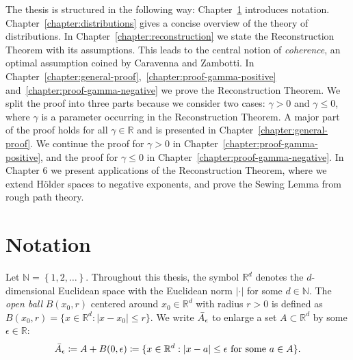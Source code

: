 The thesis is structured in the following way: Chapter~\ref{chapter:notation} introduces notation. Chapter~\ref{chapter:distributions} gives a concise overview of the theory of distributions. In Chapter~\ref{chapter:reconstruction} we state the Reconstruction Theorem with its assumptions. This leads to the central notion of \emph{coherence}, an optimal assumption coined by Caravenna and Zambotti. In Chapter~\ref{chapter:general-proof},~\ref{chapter:proof-gamma-positive} and~\ref{chapter:proof-gamma-negative} we prove the Reconstruction Theorem. We split the proof into three parts because we consider two cases: \(\gamma > 0\) and \(\gamma \leq 0\), where \({\gamma}\) is a parameter occurring in the Reconstruction Theorem. A major part of the proof holds for all \(\gamma \in \mathbb{R}\) and is presented in Chapter~\ref{chapter:general-proof}. We continue the proof for \(\gamma > 0\) in Chapter~\ref{chapter:proof-gamma-positive}, and the proof for \(\gamma \leq 0\) in Chapter~\ref{chapter:proof-gamma-negative}. In Chapter 6 we present applications of the Reconstruction Theorem, where we extend Hölder spaces to negative exponents, and prove the Sewing Lemma from rough path theory.


\section{Notation}\label{chapter:notation}

Let \( \mathbb{N} = \left\{ 1,2, \ldots \right\} \). Throughout this thesis, the symbol \( \mathbb{R}^d \) denotes the \( d \)-dimensional Euclidean space with the Euclidean norm \( |\cdot| \) for some \( d \in \mathbb{N} \). The \emph{open ball} \(B(x_0, r)\)  centered around \(x_0 \in \mathbb{R}^d\) with radius \(r > 0\) is defined as \(B(x_0,r) = \{ x \in \mathbb{R}^d : |x - x_0| \leq r \} \). We write \(\bar{A}_{\epsilon}\) to enlarge a set \(A \subset \mathbb{R}^d\) by some \(\epsilon \in \mathbb{R} \): 
\begin{align*}
    \bar{A}_{\epsilon} \coloneqq A + B(0, \epsilon) \coloneqq \{ x \in \mathbb{R}^d : |x - a| \leq \epsilon \text{ for some \(a \in A\)} \}.
\end{align*}

